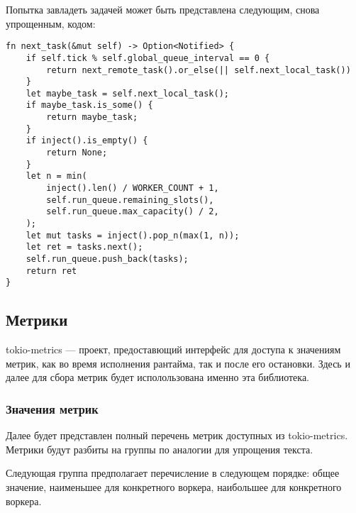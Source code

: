Попытка завладеть задачей может быть представлена следующим, снова упрощенным, кодом:

\begin{verbatim}
fn next_task(&mut self) -> Option<Notified> {
    if self.tick % self.global_queue_interval == 0 {
        return next_remote_task().or_else(|| self.next_local_task())
    }
    let maybe_task = self.next_local_task();
    if maybe_task.is_some() {
        return maybe_task;
    }
    if inject().is_empty() {
        return None;
    }
    let n = min(
        inject().len() / WORKER_COUNT + 1,
        self.run_queue.remaining_slots(),
        self.run_queue.max_capacity() / 2,
    );
    let mut tasks = inject().pop_n(max(1, n));
    let ret = tasks.next();
    self.run_queue.push_back(tasks);
    return ret
}
\end{verbatim}

\subsection{Метрики}

tokio-metrics --- проект, предоставющий интерфейс для доступа к значениям метрик, как во время исполнения рантайма, так и после его остановки. Здесь и далее для сбора метрик будет исполользована именно эта библиотека.

\subsubsection{Значения метрик}

Далее будет представлен полный перечень метрик доступных из tokio-metrics. Метрики будут разбиты на группы по аналогии для упрощения текста.

Следующая группа предполагает перечисление в следующем порядке: общее значение, наименьшее для конкретного воркера, наибольшее для конкретного воркера.

